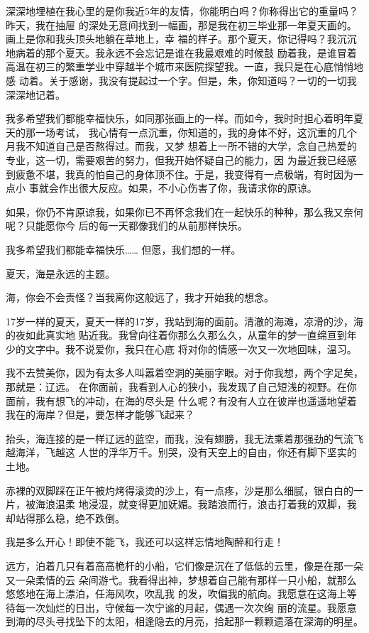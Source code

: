 		深深地埋植在我心里的是你我近5年的友情，你能明白吗？你称得出它的重量吗？昨天，我在抽屉
	的深处无意间找到一幅画，那是我在初三毕业那一年夏天画的。画上是你和我头顶头地躺在草地上，幸
	福的样子。那个夏天，你记得吗？我沉沉地病着的那个夏天。我永远不会忘记是谁在我最艰难的时候鼓
	励着我，是谁冒着高温在初三的繁重学业中穿越半个城市来医院探望我。一直，我只是在心底悄悄地感
	动着。关于感谢，我没有提起过一个字。但是，朱，你知道吗？一切的一切我深深地记着。

		我多希望我们都能幸福快乐，如同那张画上的一样。而如今，我时时担心着明年夏天的那一场考试，
	我心情有一点沉重，你知道的，我的身体不好，这沉重的几个月我不知道自己是否熬得过。而我，又梦
	想着上一所不错的大学，念自己热爱的专业，这一切，需要艰苦的努力，但我开始怀疑自己的能力，因
	为最近我已经感到疲惫不堪，我真的怕自己的身体顶不住。于是，我变得有一点极端，有时因为一点小
	事就会作出很大反应。如果，不小心伤害了你，我请求你的原谅。

		如果，你仍不肯原谅我，如果你已不再怀念我们在一起快乐的种种，那么我又奈何呢？只能愿你今
	后的每一天都像我们的从前那样快乐。

		我多希望我们都能幸福快乐…… 但愿，我们想的一样。

	\endwriting



		夏天，海是永远的主题。

		海，你会不会责怪？当我离你这般远了，我才开始我的想念。

		17岁一样的夏天，夏天一样的17岁，我站到海的面前。清澈的海滩，凉滑的沙，海的夜如此真实地
	贴近我。我曾向往着你那么久那么久，从童年的梦一直绵亘到年少的文字中。我不说爱你，我只在心底
	将对你的情感一次又一次地回味，温习。

		我不去赞美你，因为有太多人叫嚣着空洞的美丽字眼。对于你我想，两个字足矣，那就是：辽远。
	在你面前，我看到人心的狭小，我发现了自己短浅的视野。在你面前，我有想飞的冲动，在海的尽头是
	什么呢？有没有人立在彼岸也遥遥地望着我在的海岸？但是，要怎样才能够飞起来？

		抬头，海连接的是一样辽远的蓝空，而我，没有翅膀，我无法乘着那强劲的气流飞越海洋，飞越这
	人世的浮华万千。别哭，没有天空上的自由，你还有脚下坚实的土地。

		赤裸的双脚踩在正午被灼烤得滚烫的沙上，有一点疼，沙是那么细腻，银白白的一片，被海浪温柔
	地浸湿，就变得更加妩媚。我踏浪而行，浪击打着我的双脚，我却站得那么稳，绝不跌倒。

		我是多么开心！即使不能飞，我还可以这样忘情地陶醉和行走！

		远方，泊着几只有着高高桅杆的小船，它们像是沉在了低低的云里，像是在那一朵又一朵柔情的云
	朵间游弋。我看得出神，梦想着自己能有那样一只小船，就那么悠悠地在海上漂泊，任海风吹，吹乱我
	的发，吹偏我的航向。我愿意在这海上等待每一次灿烂的日出，守候每一次宁谧的月起，偶遇一次次绚
	丽的流星。我愿意到海的尽头寻找坠下的太阳，相逢隐去的月亮，拾起那一颗颗遗落在深海的明星。

